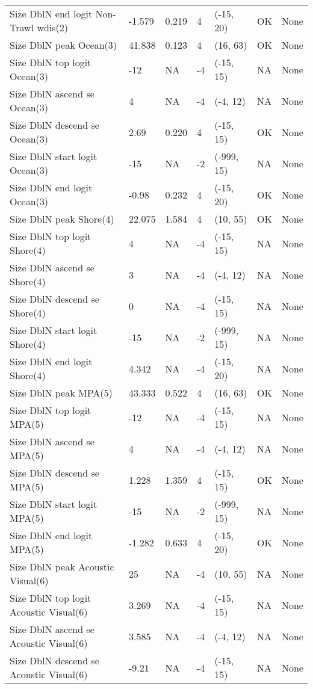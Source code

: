 \documentclass[11pt,
  english,
  letterpaper,
]{article}
\begin{document}
\begin{landscape}
\begin{longtable}[t]{>{\raggedright\arraybackslash}p{7.5cm}lllll>{\raggedright\arraybackslash}p{3.5cm}}
Size DblN end logit Non-Trawl wdis(2) & -1.579 & 0.219 & 4 & (-15, 20) & OK & None\\
Size DblN peak Ocean(3) & 41.838 & 0.123 & 4 & (16, 63) & OK & None\\
Size DblN top logit Ocean(3) & -12 & NA & -4 & (-15, 15) & NA & None\\
Size DblN ascend se Ocean(3) & 4 & NA & -4 & (-4, 12) & NA & None\\
Size DblN descend se Ocean(3) & 2.69 & 0.220 & 4 & (-15, 15) & OK & None\\
Size DblN start logit Ocean(3) & -15 & NA & -2 & (-999, 15) & NA & None\\
Size DblN end logit Ocean(3) & -0.98 & 0.232 & 4 & (-15, 20) & OK & None\\
Size DblN peak Shore(4) & 22.075 & 1.584 & 4 & (10, 55) & OK & None\\
Size DblN top logit Shore(4) & 4 & NA & -4 & (-15, 15) & NA & None\\
Size DblN ascend se Shore(4) & 3 & NA & -4 & (-4, 12) & NA & None\\
Size DblN descend se Shore(4) & 0 & NA & -4 & (-15, 15) & NA & None\\
Size DblN start logit Shore(4) & -15 & NA & -2 & (-999, 15) & NA & None\\
Size DblN end logit Shore(4) & 4.342 & NA & -4 & (-15, 20) & NA & None\\
Size DblN peak MPA(5) & 43.333 & 0.522 & 4 & (16, 63) & OK & None\\
Size DblN top logit MPA(5) & -12 & NA & -4 & (-15, 15) & NA & None\\
Size DblN ascend se MPA(5) & 4 & NA & -4 & (-4, 12) & NA & None\\
Size DblN descend se MPA(5) & 1.228 & 1.359 & 4 & (-15, 15) & OK & None\\
Size DblN start logit MPA(5) & -15 & NA & -2 & (-999, 15) & NA & None\\
Size DblN end logit MPA(5) & -1.282 & 0.633 & 4 & (-15, 20) & OK & None\\
Size DblN peak Acoustic Visual(6) & 25 & NA & -4 & (10, 55) & NA & None\\
Size DblN top logit Acoustic Visual(6) & 3.269 & NA & -4 & (-15, 15) & NA & None\\
Size DblN ascend se Acoustic Visual(6) & 3.585 & NA & -4 & (-4, 12) & NA & None\\
Size DblN descend se Acoustic Visual(6) & -9.21 & NA & -4 & (-15, 15) & NA & None\\

\end{longtable}
\end{landscape}
\end{document}
